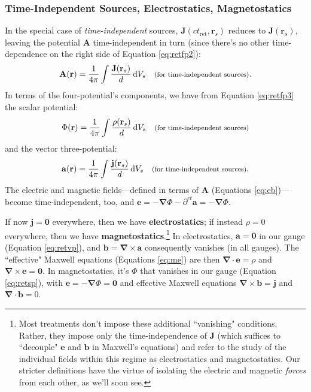 \documentclass[12pt]{article}
\renewcommand{\vv}[1]{\mathbf{#1}}
\newcommand{\dd}[1]{\mathrm{d}#1}
\newcommand{\del}{\boldsymbol{\nabla}}
\begin{document}
\subsubsection{Time-Independent Sources, Electrostatics, Magnetostatics}\label{sssec:statics}

In the special case of \emph{time-independent} sources, $\vv J(ct_{\textrm{ret}}, \vv r _{s})$ reduces to $\vv J(\vv r _{s})$, leaving the potential $\vv A$ time-independent in turn (since there's no other time-dependence on the right side of Equation \ref{eq:retfp2}):
\begin{equation}\label{eq:retfp3}
\vv A(\vv r) = \dfrac{1}{4 \pi} \int \dfrac{\vv J ( \vv r _{s})}{d} \, \dd V_{s} \quad \text{\footnotesize{(for time-independent sources)}} .
\end{equation}
In terms of the four-potential's components, we have from Equation \ref{eq:retfp3} the scalar potential:
\begin{equation}\label{eq:retsp}
\Phi(\vv r) = \dfrac{1}{4 \pi} \int \dfrac{\rho ( \vv r _{s})}{d} \, \dd V_{s} \quad \text{\footnotesize{(for time-independent sources)}}
\end{equation}
and the vector three-potential:
\begin{equation}\label{eq:retvp}
\vv a(\vv r) = \dfrac{1}{4 \pi} \int \dfrac{\vv j ( \vv r _{s})}{d} \, \dd V_{s} \quad \text{\footnotesize{(for time-independent sources)}} .
\end{equation}
The electric and magnetic fields---defined in terms of $\vv A$ (Equations \ref{eq:eb})---become time-independent, too, and $\vv e = - \del \Phi - \partial^{ct} \vv a = - \del \Phi$.

If now $\vv j = \vv 0$ everywhere, then we have \textbf{electrostatics}; if instead $\rho = 0$ everywhere, then we have \textbf{magnetostatics}.\footnote{\label{fn:statics}Most treatments don't impose these additional ``vanishing" conditions. Rather, they impose only the time-independence of $\vv J$ (which suffices to ``decouple" $\vv e$ and $\vv b$ in Maxwell's equations) and refer to the study of the individual fields within this regime as electrostatics and magnetostatics. Our stricter definitions have the virtue of isolating the electric and magnetic \emph{forces} from each other, as we'll soon see.} In electrostatics, $\vv a = \vv 0$ in our gauge (Equation \ref{eq:retvp}), and $\vv b = \del \times \vv a$ consequently vanishes (in all gauges). The ``effective" Maxwell equations (Equations \ref{eq:me}) are then $\del \cdot \vv e = \rho$ and $\del \times \vv e = \vv 0$. In magnetostatics, it's $\Phi$ that vanishes in our gauge (Equation \ref{eq:retsp}), with $\vv e = - \del \Phi = \vv 0$ and effective Maxwell equations $\del \times \vv b = \vv j$ and $\del \cdot \vv b = 0$.
\end{document}

